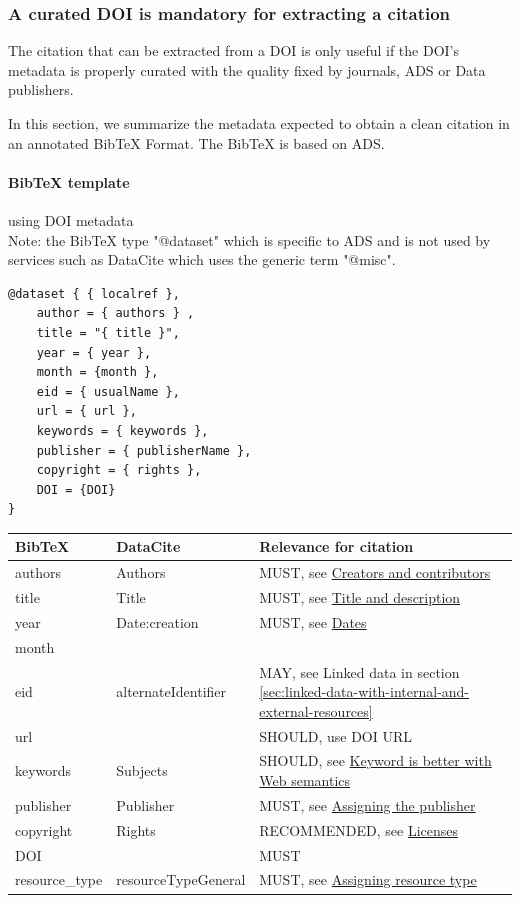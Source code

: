 \documentclass[11pt,a4paper]{ivoa}
\begin{document}
\subsubsection{A curated DOI is mandatory for extracting a citation}\hypertarget{curate-doi-is-mandatory-to-extract-citation}{}\label{sec:curate-doi-is-mandatory-to-extract-citation}

The citation that can be extracted from a DOI is only useful if the DOI's metadata is properly curated with the quality fixed by journals, ADS or Data publishers.

In this section, we summarize the metadata expected to obtain a clean citation in an annotated BibTeX Format. The BibTeX is based on ADS.


\paragraph{BibTeX template} using DOI metadata \\
Note:  the BibTeX type "@dataset" which  is specific to ADS and is not used by services such as DataCite which uses the generic term "@misc".


\begin{lstlisting}
@dataset { { localref },
	author = { authors } ,
	title = "{ title }",
	year = { year },
	month = {month },
	eid = { usualName },
	url = { url },
	keywords = { keywords },
	publisher = { publisherName },
	copyright = { rights },
	DOI = {DOI}
}
\end{lstlisting}

\begin{tabular}{|p{}|p{}|p{}|}
\hline
\textbf{BibTeX} & \textbf{DataCite} & \textbf{Relevance for citation}\\
\hline
authors & Authors & MUST, see \hyperlink{creators-and-contributors}{Creators and contributors}\\
title & Title & MUST, see \hyperlink{title-and-description}{Title and description}\\
year & Date:creation & MUST, see \hyperlink{dates}{Dates}\\
month &  & \\
eid & alternateIdentifier & MAY, see Linked data in section \ref{sec:linked-data-with-internal-and-external-resources}\\
url &  & SHOULD, use DOI URL\\
keywords & Subjects & SHOULD, see \hyperlink{keyword-is-better-with-web-semantics}{Keyword is better with Web semantics}\\
publisher & Publisher & MUST, see \hyperlink{assigning-the-publisher}{Assigning the publisher}\\
copyright & Rights & RECOMMENDED, see \hyperlink{licenses}{Licenses}\\
DOI &  & MUST\\
resource\_type & resourceTypeGeneral & MUST, see \hyperlink{assigning-resource-type}{Assigning resource type}\\
\hline
\end{tabular}\\
\end{document}
